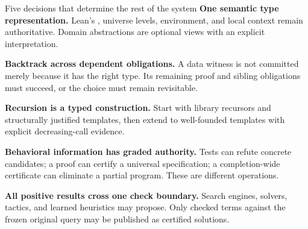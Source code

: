 \begin{decision}{Five decisions that determine the rest of the system}
\textbf{One semantic type representation.} Lean's \Expr, universe levels, environment, and local context remain authoritative. Domain abstractions are optional views with an explicit interpretation.

\textbf{Backtrack across dependent obligations.} A data witness is not committed merely because it has the right type. Its remaining proof and sibling obligations must succeed, or the choice must remain revisitable.

\textbf{Recursion is a typed construction.} Start with library recursors and structurally justified templates, then extend to well-founded templates with explicit decreasing-call evidence.

\textbf{Behavioral information has graded authority.} Tests can refute concrete candidates; a proof can certify a universal specification; a completion-wide certificate can eliminate a partial program. These are different operations.

\textbf{All positive results cross one check boundary.} Search engines, solvers, tactics, and learned heuristics may propose. Only checked terms against the frozen original query may be published as certified solutions.
\end{decision}

